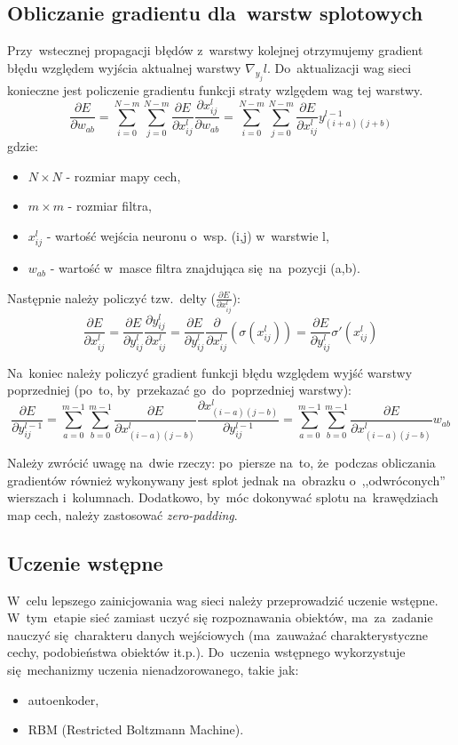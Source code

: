 \subsection{Obliczanie gradientu dla~warstw splotowych}
Przy~wstecznej propagacji błędów z~warstwy kolejnej otrzymujemy gradient błędu względem wyjścia
aktualnej warstwy $\nabla_{y_j}l$. Do~aktualizacji wag sieci konieczne jest policzenie gradientu funkcji
straty wzlgędem wag tej warstwy.
$$ \frac{\partial E}{\partial w_{ab}} 
= \sum\limits_{i=0}^{N-m}\sum\limits_{j=0}^{N-m}\frac{\partial E}{\partial x_{ij}^l}\frac{\partial
x_{ij}^l}{\partial w_{ab}}
= \sum\limits_{i=0}^{N-m}\sum\limits_{j=0}^{N-m}\frac{\partial E}{\partial x_{ij}^l}y^{l-1}_{(i+a)(j+b)}$$
gdzie:
\begin{itemize}
  \item $N\times N$ - rozmiar mapy cech,
  \item $m\times m$ - rozmiar filtra,
  \item $x_{ij}^l$ - wartość wejścia neuronu o~wsp. (i,j) w~warstwie l,
  \item $w_{ab}$ - wartość w~masce filtra znajdująca się~na~pozycji (a,b).
\end{itemize}

Następnie należy policzyć tzw.~delty ($\frac{\partial E}{\partial x_{ij}^l}$):
$$\frac{\partial E}{\partial x_{ij}^l} = \frac{\partial E}{\partial y_{ij}^l}\frac{\partial y_{ij}^l}{\partial
x_{ij}^l} =
\frac{\partial E}{\partial y_{ij}^l}\frac{\partial}{\partial x_{ij}^l}(\sigma(x_{ij}^l))
= \frac{\partial E}{\partial y_{ij}^l}\sigma'(x_{ij}^l)
$$

Na~koniec należy policzyć gradient funkcji błędu względem wyjść warstwy poprzedniej (po~to, by~przekazać
go~do~poprzedniej warstwy):
$$ \frac{\partial E}{\partial y_{ij}^{l-1}} =
\sum\limits_{a=0}^{m-1}\sum\limits_{b=0}^{m-1} \frac{\partial E}{\partial x^l_{(i-a)(j-b)}}
\frac{\partial x^l_{(i-a)(j-b)}}{\partial y_{ij}^{l-1}} =
\sum\limits_{a=0}^{m-1}\sum\limits_{b=0}^{m-1} \frac{\partial E}{\partial x^l_{(i-a)(j-b)}}w_{ab}$$

Należy zwrócić uwagę na~dwie rzeczy: po~piersze na~to, że~podczas obliczania gradientów również wykonywany
jest splot jednak na~obrazku o~,,odwróconych'' wierszach i~kolumnach. Dodatkowo, by~móc dokonywać splotu
na~krawędziach map cech, należy zastosować \textit{zero-padding}.

\subsection{Uczenie wstępne}
W~celu lepszego zainicjowania wag sieci należy przeprowadzić uczenie wstępne. W~tym~etapie sieć zamiast uczyć
się rozpoznawania obiektów, ma~za~zadanie nauczyć się~charakteru danych wejściowych (ma~zauważać
charakterystyczne cechy, podobieństwa obiektów it.p.). Do~uczenia wstępnego wykorzystuje się~mechanizmy
uczenia nienadzorowanego, takie jak:
\begin{itemize}
  \item autoenkoder,
  \item RBM (Restricted Boltzmann Machine).
\end{itemize}

